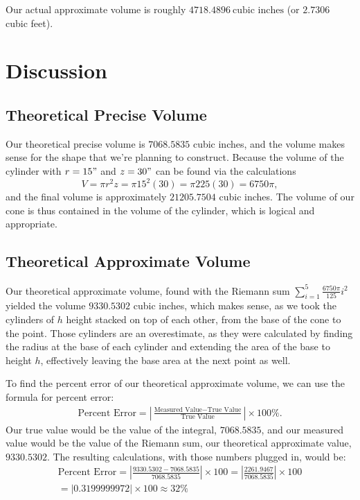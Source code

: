 \documentclass[12pt]{article}
\begin{document}
Our actual approximate volume is roughly $\boxed{4718.4896 \ \text{cubic
inches}}$ (or $2.7306$ cubic feet).

\clearpage

\section{Discussion}

\subsection{Theoretical Precise Volume}

Our theoretical precise volume is $7068.5835$ cubic inches, and the volume makes
sense for the shape that we're planning to construct. Because the volume of the
cylinder with $r = 15"$ and $z = 30"$ can be found via the calculations
\begin{equation*}
    V = \pi r^{2} z = \pi 15^{2} (30) = \pi 225 (30) = 6750 \pi,
\end{equation*}
and the final volume is approximately $21205.7504$ cubic inches. The volume of
our cone is thus contained in the volume of the cylinder, which is logical and
appropriate.

\subsection{Theoretical Approximate Volume}

Our theoretical approximate volume, found with the Riemann sum $\sum_{i=1}^{5}
\frac{6750\pi}{125} i^{2}$ yielded the volume $9330.5302$ cubic inches, which
makes sense, as we took the cylinders of $h$ height stacked on top of each
other, from the base of the cone to the point. Those cylinders are an
overestimate, as they were calculated by finding the radius at the base of each
cylinder and extending the area of the base to height $h$, effectively leaving
the base area at the next point as well.

To find the percent error of our theoretical approximate volume, we can use the
formula for percent error:
\begin{gather*}
    \text{Percent Error}
    = \left| \frac{\text{Measured Value} - \text{True Value}}{\text{True Value}} \right| \times 100\%.
\end{gather*}
Our true value would be the value of the integral, $7068.5835$, and our measured
value would be the value of the Riemann sum, our theoretical approximate value,
$9330.5302$. The resulting calculations, with those numbers plugged in, would
be:
\begin{gather*}
    \text{Percent Error} 
    = \left| \frac{9330.5302 - 7068.5835}{7068.5835} \right| \times 100
    = \left| \frac{2261.9467}{7068.5835} \right| \times 100 \\
    = \left| 0.3199999972 \right| \times 100
    \approx 32 \%
\end{gather*}
\end{document}
